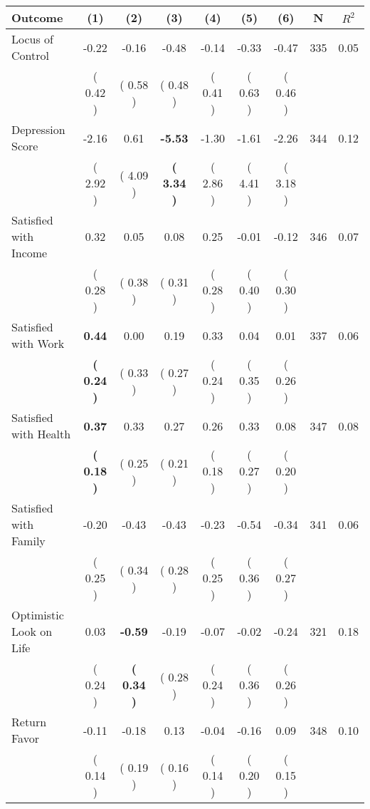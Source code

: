 \begin{tabular}{lcccccccc}
\toprule
 \textbf{Outcome} & \textbf{(1)} & \textbf{(2)} & \textbf{(3)} & \textbf{(4)} & \textbf{(5)} & \textbf{(6)} & \textbf{N} & \textbf{$ R^2$} \\
\midrule
Locus of Control &     -0.22 &     -0.16 &     -0.48 &     -0.14 &     -0.33 &     -0.47 & 335 &       0.05 \\ 
 & (     0.42 ) & (     0.58 ) & (     0.48 ) & (     0.41 ) & (     0.63 ) & (     0.46 ) & \\
Depression Score &     -2.16 &      0.61 & \textbf{    -5.53} &     -1.30 &     -1.61 &     -2.26 & 344 &       0.12 \\ 
 & (     2.92 ) & (     4.09 ) & \textbf{(     3.34 )} & (     2.86 ) & (     4.41 ) & (     3.18 ) & \\
Satisfied with Income &      0.32 &      0.05 &      0.08 &      0.25 &     -0.01 &     -0.12 & 346 &       0.07 \\ 
 & (     0.28 ) & (     0.38 ) & (     0.31 ) & (     0.28 ) & (     0.40 ) & (     0.30 ) & \\
Satisfied with Work & \textbf{     0.44} &      0.00 &      0.19 &      0.33 &      0.04 &      0.01 & 337 &       0.06 \\ 
 & \textbf{(     0.24 )} & (     0.33 ) & (     0.27 ) & (     0.24 ) & (     0.35 ) & (     0.26 ) & \\
Satisfied with Health & \textbf{     0.37} &      0.33 &      0.27 &      0.26 &      0.33 &      0.08 & 347 &       0.08 \\ 
 & \textbf{(     0.18 )} & (     0.25 ) & (     0.21 ) & (     0.18 ) & (     0.27 ) & (     0.20 ) & \\
Satisfied with Family &     -0.20 &     -0.43 &     -0.43 &     -0.23 &     -0.54 &     -0.34 & 341 &       0.06 \\ 
 & (     0.25 ) & (     0.34 ) & (     0.28 ) & (     0.25 ) & (     0.36 ) & (     0.27 ) & \\
Optimistic Look on Life &      0.03 & \textbf{    -0.59} &     -0.19 &     -0.07 &     -0.02 &     -0.24 & 321 &       0.18 \\ 
 & (     0.24 ) & \textbf{(     0.34 )} & (     0.28 ) & (     0.24 ) & (     0.36 ) & (     0.26 ) & \\
Return Favor &     -0.11 &     -0.18 &      0.13 &     -0.04 &     -0.16 &      0.09 & 348 &       0.10 \\ 
 & (     0.14 ) & (     0.19 ) & (     0.16 ) & (     0.14 ) & (     0.20 ) & (     0.15 ) & \\

\end{tabular}
